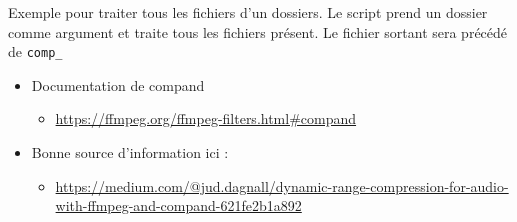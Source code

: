 \documentclass[
  french,
]{book}
\newenvironment{Shaded}{\begin{snugshade}}{\end{snugshade}}
\newcommand{\AttributeTok}[1]{\textcolor[rgb]{0.77,0.63,0.00}{#1}}
\newcommand{\BuiltInTok}[1]{#1}
\newcommand{\ControlFlowTok}[1]{\textcolor[rgb]{0.13,0.29,0.53}{\textbf{#1}}}
\newcommand{\DataTypeTok}[1]{\textcolor[rgb]{0.13,0.29,0.53}{#1}}
\newcommand{\ExtensionTok}[1]{#1}
\newcommand{\FunctionTok}[1]{\textcolor[rgb]{0.00,0.00,0.00}{#1}}
\newcommand{\KeywordTok}[1]{\textcolor[rgb]{0.13,0.29,0.53}{\textbf{#1}}}
\newcommand{\NormalTok}[1]{#1}
\newcommand{\OtherTok}[1]{\textcolor[rgb]{0.56,0.35,0.01}{#1}}
\newcommand{\PreprocessorTok}[1]{\textcolor[rgb]{0.56,0.35,0.01}{\textit{#1}}}
\newcommand{\StringTok}[1]{\textcolor[rgb]{0.31,0.60,0.02}{#1}}
\newcommand{\VariableTok}[1]{\textcolor[rgb]{0.00,0.00,0.00}{#1}}
\providecommand{\tightlist}{%
  \setlength{\itemsep}{0pt}\setlength{\parskip}{0pt}}
\begin{document}
Exemple pour traiter tous les fichiers d'un dossiers.
Le script prend un dossier comme argument et traite tous les fichiers présent.
Le fichier sortant sera précédé de \texttt{comp\_}

\begin{Shaded}
\end{Shaded}

\begin{itemize}
\tightlist
\item
  Documentation de compand

  \begin{itemize}
  \tightlist
  \item
    \url{https://ffmpeg.org/ffmpeg-filters.html\#compand}
  \end{itemize}
\item
  Bonne source d'information ici :

  \begin{itemize}
  \tightlist
  \item
    \url{https://medium.com/@jud.dagnall/dynamic-range-compression-for-audio-with-ffmpeg-and-compand-621fe2b1a892}
  \end{itemize}
\end{itemize}
\end{document}
